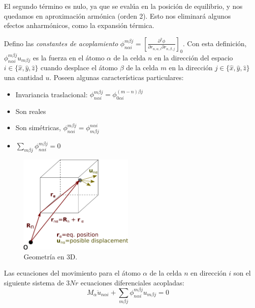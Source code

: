 El segundo término es nulo, ya que se evalúa en la posición de
equilibrio, y nos quedamos en aproximación armónica (orden 2). Esto
nos eliminará algunos efectos anharmónicos, como la expansión térmica.

Defino las \emph{constantes de acoplamiento}
$\phi_{n\alpha i}^{m\beta j} =\left[ \frac{\partial ^2 \phi}{\partial
    r_{n,\alpha,i} \partial r_{n,\beta,j}}\right]_0 $.
Con esta definición, $\phi_{n\alpha i}^{m\beta j} u_{m\beta j}$ es la
fuerza en el átomo $\alpha$ de la celda $n$ en la dirección del espacio
$i \in \{ \hat x, \hat y, \hat z \}$ cuando desplace el átomo $\beta$
de la celda $m$ en la dirección $j\in \{ \hat x, \hat y, \hat z \}$
una cantidad $u$. Poseen algunas características particulares:
\begin{itemize}
\item Invariancia traslacional: $\phi_{n\alpha i}^{m\beta j} = \phi_{0\alpha i}^{(m-n)\beta j} $
\item Son reales
\item Son simétricas, $\phi_{n\alpha i}^{m\beta j} =\phi^{n\alpha i}_{m\beta j} $
\item $ \sum _{m\beta j }\phi_{n\alpha i}^{m\beta j}  = 0$
\end{itemize}
\begin{figure}
  \centering
  \includegraphics[width=0.5\textwidth]{figures/3dmodesdiagram.png}
  \caption{Geometría en 3D.}
  \label{fig:3dmodesdiagram}
\end{figure}


Las ecuaciones del movimiento para el átomo $\alpha$ de la celda $n$
en dirección $i$ son el siguiente sistema de  $3Nr$ ecuaciones
diferenciales acopladas:
\begin{equation}
  M_\alpha \ddot u_{n\alpha i} + \sum_{m\beta j} \phi_{n\alpha i
  }^{m\beta j} u _{m\beta j} = 0
\end{equation}

